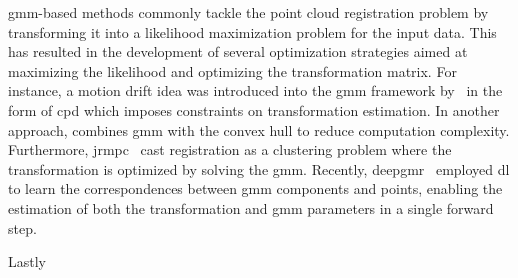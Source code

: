 
\gls{gmm}-based methods commonly tackle the point cloud registration problem by transforming it into a likelihood maximization problem for the input data. This has resulted in the development of several optimization strategies aimed at maximizing the likelihood and optimizing the transformation matrix. For instance, a motion drift idea was introduced into the \gls{gmm} framework by~\cite{information-retrieval-for-music-and-motion} in the form of \gls{cpd} which imposes constraints on transformation estimation. In another approach,\cite{convex-hull-indexed-gaussian-mixture-model-ch-gmm-for-3d-point-set-registration} combines \gls{gmm} with the convex hull to reduce computation complexity. Furthermore, \gls{jrmpc}~\cite{a-generative-model-for-the-joint-registration-of-multiple-point-sets} cast registration as a clustering problem where the transformation is optimized by solving the \gls{gmm}. Recently, \gls{deepgmr}~\cite{deepgmr:-learning-latent-gaussian-mixture-models-for-registration} employed \gls{dl} to learn the correspondences between \gls{gmm} components and points, enabling the estimation of both the transformation and \gls{gmm} parameters in a single forward step. \medskip

Lastly

